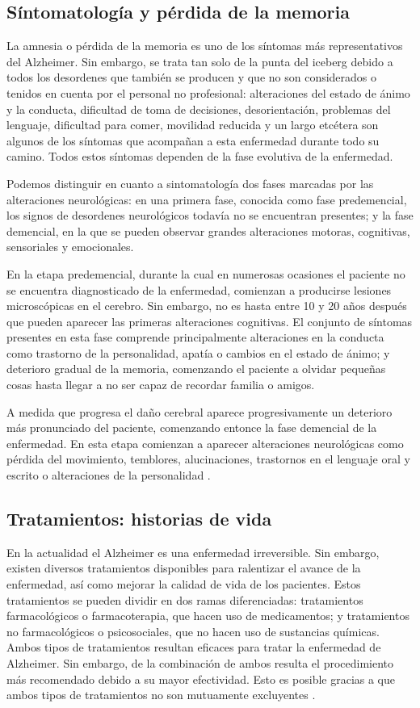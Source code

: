 \subsection{Síntomatología y pérdida de la memoria}
La amnesia o pérdida de la memoria es uno de los síntomas más representativos del Alzheimer. Sin embargo, se trata tan solo de la punta del iceberg debido a todos los desordenes que también se producen y que no son considerados o tenidos en cuenta por el personal no profesional: alteraciones del estado de ánimo y la conducta, dificultad de toma de decisiones, desorientación, problemas del lenguaje, dificultad para comer, movilidad reducida  y un largo etcétera son algunos de los síntomas que acompañan a esta enfermedad durante todo su camino. Todos estos síntomas dependen de la fase evolutiva de la enfermedad.

Podemos distinguir en cuanto a sintomatología dos fases marcadas por las alteraciones neurológicas: en una primera fase, conocida como fase predemencial, los signos de desordenes neurológicos todavía no se encuentran presentes; y la fase demencial, en la que se pueden observar grandes alteraciones motoras, cognitivas, sensoriales y emocionales.

En la etapa predemencial, durante la cual en numerosas ocasiones el paciente no se encuentra diagnosticado de la enfermedad, comienzan a producirse lesiones microscópicas en el cerebro. Sin embargo, no es hasta entre 10 y 20 años después que pueden aparecer las primeras alteraciones cognitivas. El conjunto de síntomas presentes en esta fase comprende principalmente alteraciones en la conducta como trastorno de la personalidad, apatía o cambios en el estado de ánimo; y deterioro gradual de la memoria, comenzando el paciente a olvidar pequeñas cosas hasta llegar a no ser capaz de recordar familia o amigos.

A medida que progresa el daño cerebral aparece progresivamente un deterioro más pronunciado del paciente, comenzando entonce la fase demencial de la enfermedad. En esta etapa comienzan a aparecer alteraciones neurológicas como pérdida del movimiento, temblores, alucinaciones,  trastornos en el lenguaje oral y escrito o alteraciones de la personalidad \citep{alberca-serrano-2010}.


\subsection{Tratamientos: historias de vida}
En la actualidad el Alzheimer es una enfermedad irreversible. Sin embargo, existen diversos tratamientos disponibles para ralentizar el avance de la enfermedad, así como mejorar la calidad de vida de los pacientes. Estos tratamientos se pueden dividir en dos ramas diferenciadas: tratamientos farmacológicos o farmacoterapia, que hacen uso de medicamentos; y tratamientos no farmacológicos o psicosociales, que no hacen uso de sustancias químicas. Ambos tipos de tratamientos resultan eficaces para tratar la enfermedad de Alzheimer. Sin embargo, de la combinación de ambos resulta el procedimiento más recomendado debido a su mayor efectividad. Esto es posible gracias a que ambos tipos de tratamientos no son mutuamente excluyentes \citep{romano2007enfermedad}.

